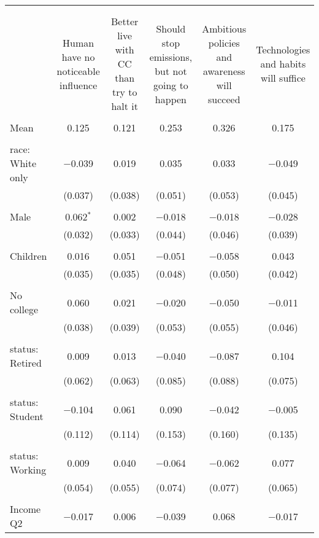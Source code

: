 
\begin{tabular}{@{\extracolsep{5pt}}lccccc} 
\\[-1.8ex]\hline 
\hline \\[-1.8ex] 
\\[-1.8ex] & Human have no noticeable influence & Better live with CC than try to halt it & Should stop emissions, but not going to happen & Ambitious policies and awareness will succeed & Technologies and habits will suffice \\ 
\hline \\[-1.8ex] 
 Mean & 0.125 & 0.121 & 0.253 & 0.326 & 0.175  \\ \hline \\[-1.8ex] race: White only & $-$0.039 & 0.019 & 0.035 & 0.033 & $-$0.049 \\ 
  & (0.037) & (0.038) & (0.051) & (0.053) & (0.045) \\ 
  & & & & & \\ 
 Male & 0.062$^{*}$ & 0.002 & $-$0.018 & $-$0.018 & $-$0.028 \\ 
  & (0.032) & (0.033) & (0.044) & (0.046) & (0.039) \\ 
  & & & & & \\ 
 Children & 0.016 & 0.051 & $-$0.051 & $-$0.058 & 0.043 \\ 
  & (0.035) & (0.035) & (0.048) & (0.050) & (0.042) \\ 
  & & & & & \\ 
 No college & 0.060 & 0.021 & $-$0.020 & $-$0.050 & $-$0.011 \\ 
  & (0.038) & (0.039) & (0.053) & (0.055) & (0.046) \\ 
  & & & & & \\ 
 status: Retired & 0.009 & 0.013 & $-$0.040 & $-$0.087 & 0.104 \\ 
  & (0.062) & (0.063) & (0.085) & (0.088) & (0.075) \\ 
  & & & & & \\ 
 status: Student & $-$0.104 & 0.061 & 0.090 & $-$0.042 & $-$0.005 \\ 
  & (0.112) & (0.114) & (0.153) & (0.160) & (0.135) \\ 
  & & & & & \\ 
 status: Working & 0.009 & 0.040 & $-$0.064 & $-$0.062 & 0.077 \\ 
  & (0.054) & (0.055) & (0.074) & (0.077) & (0.065) \\ 
  & & & & & \\ 
 Income Q2 & $-$0.017 & 0.006 & $-$0.039 & 0.068 & $-$0.017 \\ 

\end{tabular}

